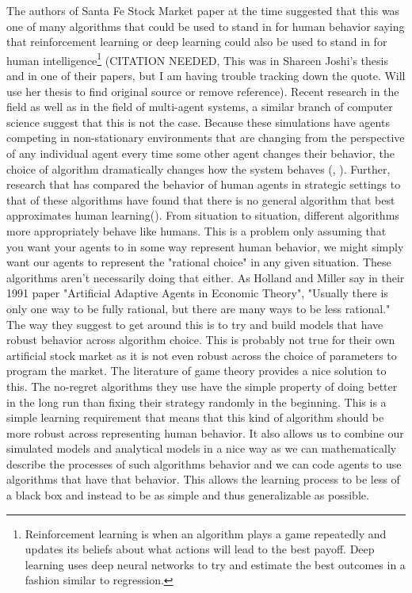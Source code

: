 \documentclass[12pt,twoside]{reedthesis}
\begin{document}
The authors of Santa Fe Stock Market paper at the time suggested that this was one of many algorithms that could be used to stand in for human behavior saying that reinforcement learning or deep learning could also be used to stand in for human intelligence\footnote{Reinforcement learning is when an algorithm plays a game repeatedly and updates its beliefs about what actions will lead to the best payoff. Deep learning uses deep neural networks to try and estimate the best outcomes in a fashion similar to regression.} (CITATION NEEDED, This was in Shareen Joshi's thesis and in one of their papers, but I am having trouble tracking down the quote. Will use her thesis to find original source or remove reference). Recent research in the field as well as in the field of multi-agent systems, a similar branch of computer science suggest that this is not the case. Because these simulations have agents competing in non-stationary environments that are changing from the perspective of any individual agent every time some other agent changes their behavior, the choice of algorithm dramatically changes how the system behaves (\citep{Rejeb2005}, \cite{Shoham2008}). Further, research that has compared the behavior of human agents in strategic settings to that of these algorithms have found that there is no general algorithm that best approximates human learning(\cite{Tesfatsion2002}). From situation to situation, different algorithms more appropriately behave like humans. This is a problem only assuming that you want your agents to in some way represent human behavior, we might simply want our agents to represent the "rational choice" in any given situation. These algorithms aren't necessarily doing that either. As Holland and Miller say in their 1991 paper "Artificial Adaptive Agents in Economic Theory", "Usually there is only one way to be fully rational, but there are many ways to be less rational." The way they suggest to get around this is to try and build models that have robust behavior across algorithm choice. This is probably not true for their own artificial stock market as it is not even robust across the choice of parameters to program the market. The literature of game theory provides a nice solution to this. The no-regret algorithms they use have the simple property of doing better in the long run than fixing their strategy randomly in the beginning. This is a simple learning requirement that means that this kind of algorithm should be more robust across representing human behavior. It also allows us to combine our simulated models and analytical models in a nice way as we can mathematically describe the processes of such algorithms behavior and we can code agents to use algorithms that have that behavior. This allows the learning process to be less of a black box and instead to be as simple and thus generalizable as possible.
\end{document}
